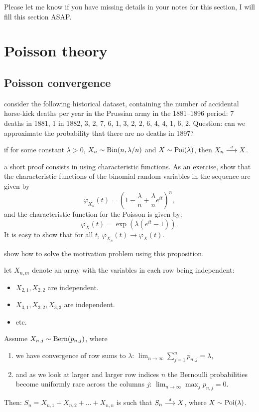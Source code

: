 \documentclass{article}
\begin{document}
Please let me know if you have missing details in your notes for this section, I will fill this section ASAP.


\section{Poisson theory}

\subsection{Poisson convergence}

 consider the following historical dataset, containing the number of accidental horse-kick deaths per year in the Prussian army in the 1881--1896 period: 7 deaths in 1881, 1 in 1882, 3, 2, 7, 6, 1, 3, 2, 2, 6, 4, 4, 1, 6, 2. Question: can we approximate the probability that there are no deaths in 1897?

 if for some constant $\lambda > 0$,  $X_n \sim \operatorname{Bin}(n, \lambda/n)$ and $X \sim \operatorname{Poi}(\lambda)$, then $X_n \stackrel{\scriptscriptstyle d}{\longrightarrow} X$.

 a short proof consists in using characteristic functions. As an exercise, show that the characteristic functions of the binomial random variables in the sequence are given by 
\[ \varphi_{X_n}(t) = \left( 1 - \frac{\lambda}{n} + \frac{\lambda}{n} e^{it} \right)^n, \]
and the characteristic function for the Poisson is given by:
\[ \varphi_{X}(t)  = \exp(\lambda(e^{it} - 1)). \]
It is easy to show that for all $t$, $\varphi_{X_n}(t) \to  \varphi_{X}(t)$. 

 show how to solve the motivation problem using this proposition.

 let $X_{n,m}$ denote an array with the variables in each row being independent:
\begin{itemize}
  \item $X_{2,1}, X_{2,2}$ are independent.
  \item $X_{3,1}, X_{3,2}, X_{3,3}$ are independent.
  \item etc.
\end{itemize}
Assume $X_{n,j} \sim \operatorname{Bern}(p_{n,j})$, where
\begin{enumerate}
  \item we have convergence of row sums to $\lambda$: $\lim_{n\to\infty} \sum_{j=1}^n p_{n,j} = \lambda$,
  \item and as we look at larger and larger row indices $n$ the Bernoulli probabilities become uniformly rare across the columns $j$: $\lim_{n\to\infty} \max_j p_{n,j} = 0$.
\end{enumerate}
Then: $S_n = X_{n,1} + X_{n,2} + \dots + X_{n,n}$ is such that $S_n \stackrel{\scriptscriptstyle d}{\longrightarrow} X$, where $X \sim \operatorname{Poi}(\lambda)$.
\end{document}
